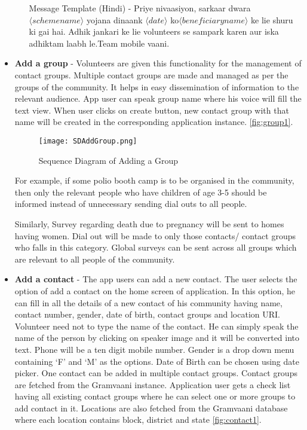 \begin{itemize}
\begin{enumerate}
Message Template (Hindi) - Priye nivaasiyon​, sarkaar dwara $\langle schemename \rangle$ yojana dinaank $\langle date \rangle$ ko ​$\langle beneficiaryname \rangle$ ke lie ​shuru ki gai hai. Adhik jankari ke lie volunteers se sampark karen aur iska adhiktam laabh le.Team mobile vaani.
\end{enumerate}


\item \textbf {Add a group} - Volunteers are given this functionality for the management of contact groups. Multiple contact groups are made and managed as per the groups of the community. It helps in easy dissemination of information to the relevant audience. App user can speak group name where his voice will fill the text view. When user clicks on create button, new contact group with that name will be created in the corresponding application instance. \ref{fig:group1}.

\begin{figure}[H]
    \centering
	\texttt{[image: SDAddGroup.png]}
    \caption{ Sequence Diagram of Adding a Group}
    \label{fig:Sequence Diagram of Adding a Group}
\end{figure}

For example, if some polio booth camp is to be organised in the community, then only the relevant people who have children of age 3-5 should be informed instead of unnecessary sending dial outs to all people.

Similarly, Survey regarding death due to pregnancy will be sent to homes having women. Dial out will be made to only those contacts/ contact groups who falls in this category. Global surveys can be sent across all groups which are relevant to all people of the community.

 \item \textbf {Add a contact} - The app users can add a new contact. The user selects the option of add a contact on the  home screen of application. In this option, he can fill in all the details of a new contact of his community having name, contact number, gender, date of birth, contact groups and location URI. Volunteer need not to type the name of the contact. He can simply speak the name of the person by clicking on speaker image and it will be converted into text. Phone will be a ten digit mobile number. Gender is a drop down menu containing ‘F’ and ‘M’ as the options. Date of Birth can be chosen using date picker. One contact can be added in multiple  contact groups. Contact groups are fetched from the Gramvaani instance. Application user gets a check list having all existing contact groups where he can select one or more groups to add contact in it. Locations are also fetched from the Gramvaani database where each location contains block, district and state \ref{fig:contact1}.
 

\end{itemize}
